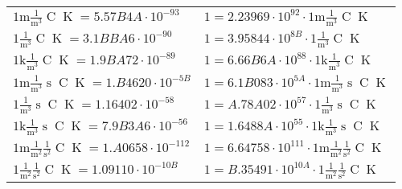\begin{center}
\begin{longtable}{l l}
{\color{gray}$1 \bm{\mathrm{ m}}\frac1{\operatorname{m}^3}{}{\operatorname{C}}{\operatorname{K}} = 5.57B4A\cdot10^{-93} $}   & {\color{gray}$ 1 = 2.23969\cdot10^{92} \cdot 1 \bm{\mathrm{ m}}\frac1{\operatorname{m}^3}{}{\operatorname{C}}{\operatorname{K}}$}  \\
{\color{black}$1 \bm{\mathrm{ }}\frac1{\operatorname{m}^3}{}{\operatorname{C}}{\operatorname{K}} = 3.1BBA6\cdot10^{-90} $}   & {\color{black}$ 1 = 3.95844\cdot10^{8B} \cdot 1 \bm{\mathrm{ }}\frac1{\operatorname{m}^3}{}{\operatorname{C}}{\operatorname{K}}$}  \\
{\color{gray}$1 \bm{\mathrm{ k}}\frac1{\operatorname{m}^3}{}{\operatorname{C}}{\operatorname{K}} = 1.9BA72\cdot10^{-89} $}   & {\color{gray}$ 1 = 6.66B6A\cdot10^{88} \cdot 1 \bm{\mathrm{ k}}\frac1{\operatorname{m}^3}{}{\operatorname{C}}{\operatorname{K}}$}  \\
{\color{gray}$1 \bm{\mathrm{ m}}\frac1{\operatorname{m}^3}{\operatorname{s}}{\operatorname{C}}{\operatorname{K}} = 1.B4620\cdot10^{-5B} $}   & {\color{gray}$ 1 = 6.1B083\cdot10^{5A} \cdot 1 \bm{\mathrm{ m}}\frac1{\operatorname{m}^3}{\operatorname{s}}{\operatorname{C}}{\operatorname{K}}$}  \\
{\color{black}$1 \bm{\mathrm{ }}\frac1{\operatorname{m}^3}{\operatorname{s}}{\operatorname{C}}{\operatorname{K}} = 1.16402\cdot10^{-58} $}   & {\color{black}$ 1 = A.78A02\cdot10^{57} \cdot 1 \bm{\mathrm{ }}\frac1{\operatorname{m}^3}{\operatorname{s}}{\operatorname{C}}{\operatorname{K}}$}  \\
{\color{gray}$1 \bm{\mathrm{ k}}\frac1{\operatorname{m}^3}{\operatorname{s}}{\operatorname{C}}{\operatorname{K}} = 7.9B3A6\cdot10^{-56} $}   & {\color{gray}$ 1 = 1.6488A\cdot10^{55} \cdot 1 \bm{\mathrm{ k}}\frac1{\operatorname{m}^3}{\operatorname{s}}{\operatorname{C}}{\operatorname{K}}$}  \\
{\color{gray}$1 \bm{\mathrm{ m}}\frac1{\operatorname{m}^2}\frac1{\operatorname{s}^2}{\operatorname{C}}{\operatorname{K}} = 1.A0658\cdot10^{-112} $}   & {\color{gray}$ 1 = 6.64758\cdot10^{111} \cdot 1 \bm{\mathrm{ m}}\frac1{\operatorname{m}^2}\frac1{\operatorname{s}^2}{\operatorname{C}}{\operatorname{K}}$}  \\
{\color{black}$1 \bm{\mathrm{ }}\frac1{\operatorname{m}^2}\frac1{\operatorname{s}^2}{\operatorname{C}}{\operatorname{K}} = 1.09110\cdot10^{-10B} $}   & {\color{black}$ 1 = B.35491\cdot10^{10A} \cdot 1 \bm{\mathrm{ }}\frac1{\operatorname{m}^2}\frac1{\operatorname{s}^2}{\operatorname{C}}{\operatorname{K}}$}  \\

\end{longtable}
\end{center}
